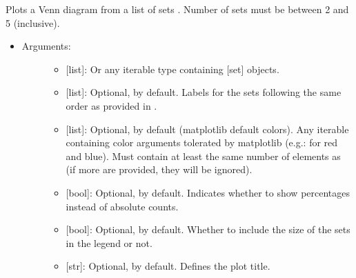\documentclass[letterpaper,10pt,english]{sphinxmanual}
\begin{document}

\begin{fulllineitems}
\label{\detokenize{plots:data_tools.plots.venn}}
Plots a Venn diagram from a list of sets . Number of sets must be
between 2 and 5 (inclusive).
\begin{itemize}
\item {} \begin{description}
\item[{Arguments:}] \leavevmode\begin{itemize}
\item {} 
 {[}list{]}: Or any iterable type containing {[}set{]} objects.

\item {} 
 {[}list{]}: Optional, \sphinxcode{\sphinxupquote{{[}'A', 'B', 'C', 'D', 'E'{]}}} by
default. Labels for the sets following the same order as
provided in .

\item {} 
 {[}list{]}: Optional, \sphinxcode{\sphinxupquote{{[}'C0', 'C1' 'C2', 'C3', 'C4'{]}}} by
default (matplotlib default colors). Any iterable containing
color arguments tolerated by matplotlib (e.g.: \sphinxcode{\sphinxupquote{{[}'r', 'b'{]}}}
for red and blue). Must contain at least the same number of
elements as  (if more are provided, they will be ignored).

\item {} 
 {[}bool{]}: Optional,  by default. Indicates
whether to show percentages instead of absolute counts.

\item {} 
 {[}bool{]}: Optional,  by default. Whether to
include the size of the sets in the legend or not.

\item {} 
 {[}str{]}: Optional,  by default. Defines the plot
title.


\end{itemize}
\end{description}
\end{itemize}
\end{fulllineitems}
\end{document}
